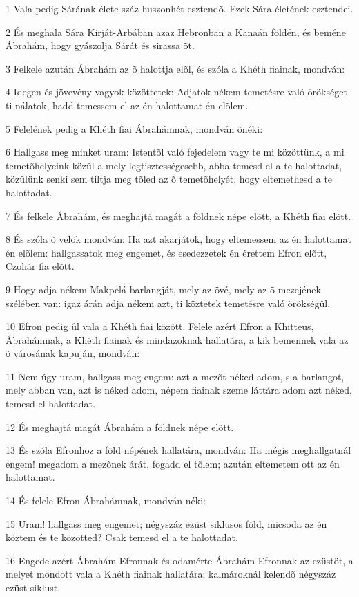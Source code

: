 \par 1 Vala pedig Sárának élete száz huszonhét esztendõ. Ezek Sára életének esztendei.
\par 2 És meghala Sára Kirját-Arbában azaz Hebronban a Kanaán földén, és beméne Ábrahám, hogy gyászolja Sárát és sirassa õt.
\par 3 Felkele azután Ábrahám az õ halottja elõl, és szóla a Khéth fiainak, mondván:
\par 4 Idegen és jövevény vagyok közöttetek: Adjatok nékem temetésre való örökséget ti nálatok, hadd temessem el az én halottamat én elõlem.
\par 5 Felelének pedig a Khéth fiai Ábrahámnak, mondván õnéki:
\par 6 Hallgass meg minket uram: Istentõl való fejedelem vagy te mi közöttünk, a mi temetõhelyeink közûl a mely legtisztességesebb, abba temesd el a te halottadat, közûlünk senki sem tiltja meg tõled az õ temetõhelyét, hogy eltemethesd a te halottadat.
\par 7 És felkele Ábrahám, és meghajtá magát a földnek népe elõtt, a Khéth fiai elõtt.
\par 8 És szóla õ velök mondván: Ha azt akarjátok, hogy eltemessem az én halottamat én elõlem: hallgassatok meg engemet, és esedezzetek én érettem Efron elõtt, Czohár fia elõtt.
\par 9 Hogy adja nékem Makpelá barlangját, mely az övé, mely az õ mezejének szélében van: igaz árán adja nékem azt, ti köztetek temetésre való örökségûl.
\par 10 Efron pedig ûl vala a Khéth fiai között. Felele azért Efron a Khitteus, Ábrahámnak, a Khéth fiainak és mindazoknak hallatára, a kik bemennek vala az õ városának kapuján, mondván:
\par 11 Nem úgy uram, hallgass meg engem: azt a mezõt néked adom, s a barlangot, mely abban van, azt is néked adom, népem fiainak szeme láttára adom azt néked, temesd el halottadat.
\par 12 És meghajtá magát Ábrahám a földnek népe elõtt.
\par 13 És szóla Efronhoz a föld népének hallatára, mondván: Ha mégis meghallgatnál engem! megadom a mezõnek árát, fogadd el tõlem; azután eltemetem ott az én halottamat.
\par 14 És felele Efron Ábrahámnak, mondván néki:
\par 15 Uram! hallgass meg engemet; négyszáz ezüst siklusos föld, micsoda az én köztem és te közötted? Csak temesd el a te halottadat.
\par 16 Engede azért Ábrahám Efronnak és odamérte Ábrahám Efronnak az ezüstöt, a melyet mondott vala a Khéth fiainak hallatára; kalmároknál kelendõ négyszáz ezüst siklust.
